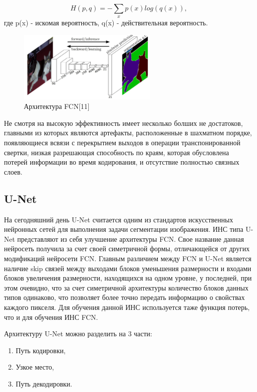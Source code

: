 \documentclass[bachelor, och, coursework]{shiza}
\begin{document}
\begin{equation}
    H(p, q) = -\sum\limits_{x}p(x)log(q(x)), 
\end{equation}
где p(x) - искомая вероятность, q(x) - действительная вероятность.

\begin{figure}[H]
    \centering
    \includegraphics[width=0.6\textwidth]{9}
    \caption{Архитектура FCN[11]}
    \label{fig:img1}
\end{figure}

Не смотря на высокую эффективность имеет несколько болших не достатоков, главными из которых являются артефакты, расположенные в шахматном
порядке, появляющиеся всвязи с перекрытием выходов в операции транспонированной свертки, низкая разрешающая способность по краям, которая
обусловлена потерей информации во время кодирования, и отсутствие полностью связных слоев.

\subsection{U-Net}

На сегодняшний день U-Net считается одним из стандартов искусственных нейронных сетей для выполнения задачи сегментации изображения. ИНС типа 
U-Net представляют из себя улучшение архитектуры FCN. Свое название данная нейросеть получила за счет своей симетричной формы, отличающейся от 
других модификаций нейросети FCN. Главным различием между FCN и U-Net является наличие skip связей между выходами блоков уменьшения размерности 
и входами блоков увеличения размерности, находящихся на одном уровне, у последней, при этом очевидно, что за счет симетричной архитектуры количество 
блоков данных типов одинаково, что позволяет более точно передать информацию о свойствах каждого пикселя. Для обучения данной ИНС используется таже 
функция потерь, что и для обучения ИНС FCN.

Архитектуру U-Net можно разделить на 3 части:

\begin{enumerate}
    \item Путь кодировки,
    \item Узкое место, 
    \item Путь декодировки.
\end{enumerate}
\end{document}
